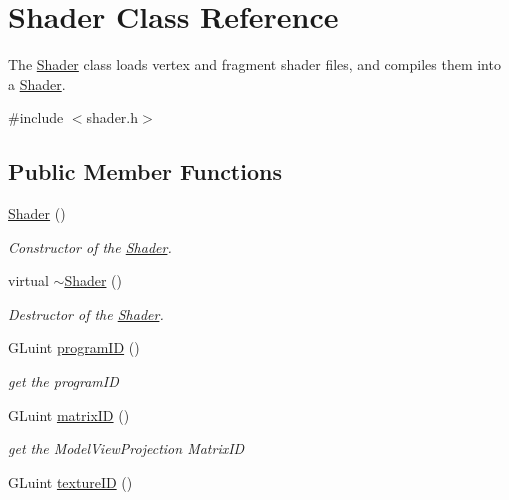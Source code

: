 \hypertarget{class_shader}{}\section{Shader Class Reference}
\label{class_shader}


The \hyperlink{class_shader}{Shader} class loads vertex and fragment shader files, and compiles them into a \hyperlink{class_shader}{Shader}.  




{\ttfamily \#include $<$shader.\+h$>$}

\subsection*{Public Member Functions}
\begin{DoxyCompactItemize}
\item 
\mbox{\label{class_shader_a0d654ebaca4e0555197c0724c6d30610}} 
\hyperlink{class_shader_a0d654ebaca4e0555197c0724c6d30610}{Shader} ()
\begin{DoxyCompactList}\small\item\em Constructor of the \hyperlink{class_shader}{Shader}. \end{DoxyCompactList}\item 
\mbox{\label{class_shader_aff01df87e8a102f270b5b135a295e59d}} 
virtual \hyperlink{class_shader_aff01df87e8a102f270b5b135a295e59d}{$\sim$\+Shader} ()
\begin{DoxyCompactList}\small\item\em Destructor of the \hyperlink{class_shader}{Shader}. \end{DoxyCompactList}\item 
G\+Luint \hyperlink{class_shader_a64691ffa0d0d8b5ecdc4d06e698422bd}{program\+ID} ()
\begin{DoxyCompactList}\small\item\em get the program\+ID \end{DoxyCompactList}\item 
G\+Luint \hyperlink{class_shader_ac9bb10cba974bc2fb4ba78758591967f}{matrix\+ID} ()
\begin{DoxyCompactList}\small\item\em get the Model\+View\+Projection Matrix\+ID \end{DoxyCompactList}\item 
G\+Luint \hyperlink{class_shader_abccab59f58d517c4c2ac392f522b0675}{texture\+ID} ()

\end{DoxyCompactItemize}
